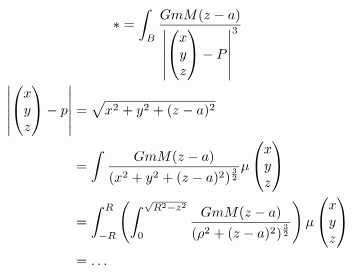 \begin{bsp*}[note = homogene Kugel mit Radius $R$]
\begin{gather*}
		* = \int_B \frac{GmM(z-a)}{\abs{\begin{pmatrix} x \\ y \\ z \end{pmatrix} - P}^3} \\
		\begin{split}
			\abs{\begin{pmatrix} x \\ y \\ z \end{pmatrix} - p}
				&= \sqrt{x^2 + y^2 + (z-a)^2} \\
				&= \int \frac{GmM(z-a)}{(x^2 + y^2 + (z-a)^2)^{\frac{3}{2}}} \mu\begin{pmatrix} x \\ y \\ z \end{pmatrix} \\
				&= \int_{-R}^R \left( \int_0^{\sqrt{R^2 - z^2}} \frac{GmM(z-a)}{(\rho^2 + (z-a)^2)^{\frac{3}{2}}} \right) \mu\begin{pmatrix} x \\ y \\ z \end{pmatrix} \\
				&= \dots
		\end{split}
	\end{gather*}
\end{bsp*}
